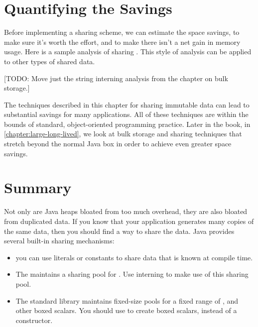 \section{Quantifying the Savings}
\label{sec:quantifying-sharing-savings}

Before implementing a sharing scheme, we can estimate the
space savings, to make sure it's worth the effort, and to make there isn't a
net gain in memory usage.  Here is a sample analysis of sharing .
This style of analysis can be applied to other types of shared data.

[TODO: Move just the string interning analysis from the chapter on
bulk storage.]

The techniques described in this chapter for sharing immutable
data can lead to substantial savings for many applications.  All of these
techniques are within the bounds of standard, object-oriented programming
practice. Later in the book, in \autoref{chapter:large-long-lived}, we look at
bulk storage and sharing techniques that stretch beyond the normal Java box in
order to achieve even greater space savings. 




\section{Summary} 
Not only are Java heaps bloated from too much overhead, they
are also bloated from duplicated data. If you know that your application
generates many copies of the same data, then you should find a way to share the
data. Java provides several built-in sharing mechanisms:

\begin{itemize}
  \item you can use  literals or  constants to share
  data that is known at compile time.
  \item The \jre maintains a sharing
  pool for . Use  interning to make use of this
  sharing pool.
  \item The standard library maintains fixed-size pools for
   a fixed range of , and other boxed scalars. You should use
    to create boxed scalars, instead of a constructor.
\end{itemize}

